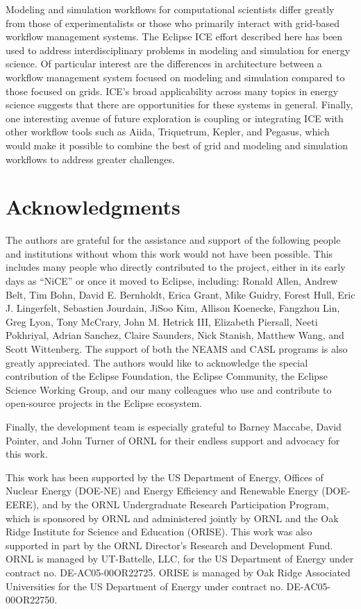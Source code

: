 Modeling and simulation workflows for computational scientists differ
greatly from those of experimentalists or those who primarily interact with
grid-based workflow management systems. The Eclipse ICE effort described here 
has been used to address interdisciplinary problems in 
modeling and simulation for energy science. Of particular interest are the
differences in architecture between a workflow management system focused
on modeling and simulation compared to those focused on grids. ICE's broad
applicability across many topics in energy science suggests that
there are opportunities for these systems in general. Finally, one 
interesting avenue of future exploration is coupling or integrating ICE 
with other workflow tools such as Aiida, Triquetrum, Kepler, and Pegasus,
which would make it possible to combine the best of grid and modeling and
simulation workflows to address greater challenges.

\section*{Acknowledgments}\label{acknowledgments}

The authors are grateful for the assistance and support of the following
people and institutions without whom this work would not have been
possible. This includes many people who directly contributed to the
project, either in its early days as ``NiCE'' or once it moved to
Eclipse, including: Ronald Allen, Andrew Belt, Tim Bohn, David E.
Bernholdt, Erica Grant, Mike Guidry, Forest Hull, Eric J. Lingerfelt,
Sebastien Jourdain, JiSoo Kim, Allison Koenecke, Fangzhou Lin, Greg
Lyon, Tony McCrary, John M. Hetrick III, Elizabeth Piersall, Neeti
Pokhriyal, Adrian Sanchez, Claire Saunders, Nick Stanish, Matthew Wang, and
Scott Wittenberg. The support of both the NEAMS and CASL programs is also
greatly appreciated. The authors would like to acknowledge the special
contribution of the Eclipse Foundation, the Eclipse Community, the
Eclipse Science Working Group, and our many colleagues who use and
contribute to open-source projects in the Eclipse ecosystem.

Finally, the development team is especially grateful to Barney Maccabe,
David Pointer, and John Turner of ORNL for their
endless support and advocacy for this work.

This work has been supported by the US Department of Energy, Offices of
Nuclear Energy (DOE-NE) and Energy Efficiency and Renewable Energy
(DOE-EERE), and by the ORNL Undergraduate Research Participation
Program, which is sponsored by ORNL and administered jointly by ORNL and
the Oak Ridge Institute for Science and Education (ORISE). This work was
also supported in part by the ORNL Director's
Research and Development Fund. ORNL is managed by UT-Battelle, LLC, for
the US Department of Energy under contract no. DE-AC05-00OR22725. ORISE
is managed by Oak Ridge Associated Universities for the US Department of
Energy under contract no. DE-AC05-00OR22750.

